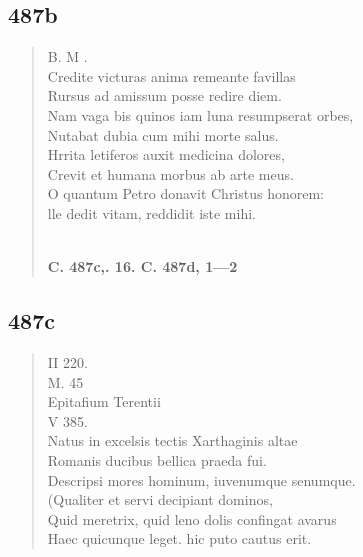 \documentclass[11pt, a4paper]{report}
\begin{document}
            \subsection*{487b}
      \begin{verse}
      B. M . \\ Credite victuras anima remeante favillas \\ Rursus ad amissum posse redire diem. \\ Nam vaga bis quinos iam luna resumpserat orbes, \\ Nutabat dubia cum mihi morte salus. \\ Hrrita letiferos auxit medicina dolores, \\ Crevit et humana morbus ab arte meus. \\ O quantum Petro donavit Christus honorem: \\ lle dedit vitam, reddidit iste mihi. \\ 
        ﻿\pagebreak 
    \begin{center} \textbf{C. 487c,. 16. C. 487d, 1—2} \end{center} \marginpar{[40]} 
      \end{verse}
  
            \subsection*{487c}
      \begin{verse}
      II 220. \\ M. 45 \\ Epitafium Terentii \\ V 385. \\ Natus in excelsis tectis Xarthaginis altae \\ Romanis ducibus bellica praeda fui. \\ Descripsi mores hominum, iuvenumque senumque. \\ (Qualiter et servi decipiant dominos, \\ Quid meretrix, quid leno dolis confingat avarus \\ Haec quicunque leget. hic puto cautus erit. \\ 
      \end{verse}
  
\end{document}
